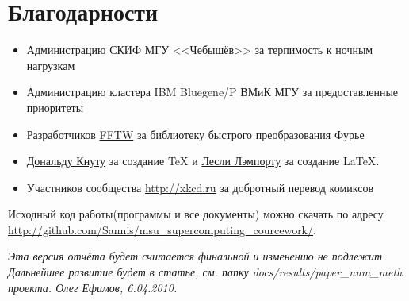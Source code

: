 \section{Благодарности}

\begin{itemize}
  \item Администрацию СКИФ МГУ <<Чебышёв>> за терпимость к ночным нагрузкам
  \item Администрацию кластера IBM Bluegene/P ВМиК МГУ за предоставленные приоритеты
  \item Разработчиков \href{http://fftw.org}{FFTW} за библиотеку быстрого преобразования Фурье
  \item \href{http://en.wikipedia.org/wiki/Donald\_Knuth}{Дональду Кнуту} за создание {\TeX} и  \href{http://en.wikipedia.org/wiki/Leslie\_Lamport}{Лесли Лэмпорту} за создание {\LaTeX}.
  \item Участников сообщества \url{http://xkcd.ru} за добротный перевод комиксов
\end{itemize}

Исходный код работы(программы и все документы) можно скачать по адресу \\ \url{http://github.com/Sannis/msu_supercomputing_courcework/}.

\textit{Эта версия отчёта будет считается финальной и изменению не подлежит.
Дальнейшее развитие будет в статье, см. папку docs/results/paper\_num\_meth проекта.
Олег Ефимов, 6.04.2010.}
